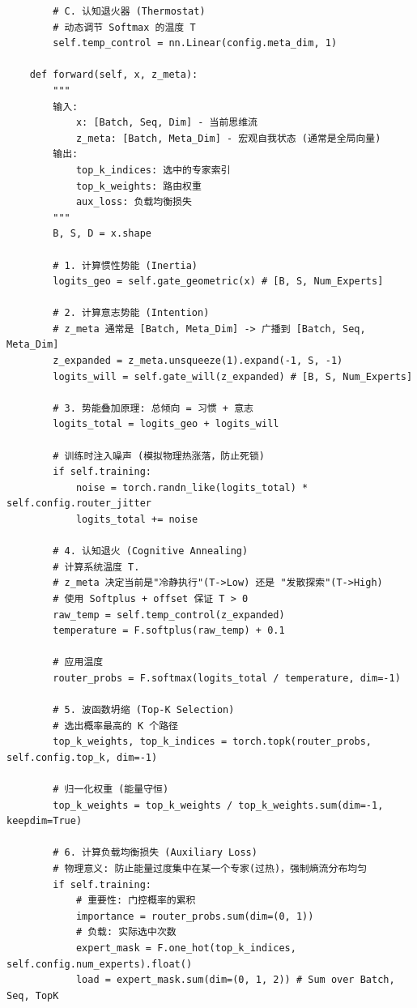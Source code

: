 \begin{lstlisting}
        # C. 认知退火器 (Thermostat)
        # 动态调节 Softmax 的温度 T
        self.temp_control = nn.Linear(config.meta_dim, 1)

    def forward(self, x, z_meta):
        """
        输入:
            x: [Batch, Seq, Dim] - 当前思维流
            z_meta: [Batch, Meta_Dim] - 宏观自我状态 (通常是全局向量)
        输出:
            top_k_indices: 选中的专家索引
            top_k_weights: 路由权重
            aux_loss: 负载均衡损失
        """
        B, S, D = x.shape

        # 1. 计算惯性势能 (Inertia)
        logits_geo = self.gate_geometric(x) # [B, S, Num_Experts]

        # 2. 计算意志势能 (Intention)
        # z_meta 通常是 [Batch, Meta_Dim] -> 广播到 [Batch, Seq, Meta_Dim]
        z_expanded = z_meta.unsqueeze(1).expand(-1, S, -1)
        logits_will = self.gate_will(z_expanded) # [B, S, Num_Experts]

        # 3. 势能叠加原理: 总倾向 = 习惯 + 意志
        logits_total = logits_geo + logits_will

        # 训练时注入噪声 (模拟物理热涨落，防止死锁)
        if self.training:
            noise = torch.randn_like(logits_total) * self.config.router_jitter
            logits_total += noise

        # 4. 认知退火 (Cognitive Annealing)
        # 计算系统温度 T.
        # z_meta 决定当前是"冷静执行"(T->Low) 还是 "发散探索"(T->High)
        # 使用 Softplus + offset 保证 T > 0
        raw_temp = self.temp_control(z_expanded)
        temperature = F.softplus(raw_temp) + 0.1

        # 应用温度
        router_probs = F.softmax(logits_total / temperature, dim=-1)

        # 5. 波函数坍缩 (Top-K Selection)
        # 选出概率最高的 K 个路径
        top_k_weights, top_k_indices = torch.topk(router_probs, self.config.top_k, dim=-1)

        # 归一化权重 (能量守恒)
        top_k_weights = top_k_weights / top_k_weights.sum(dim=-1, keepdim=True)

        # 6. 计算负载均衡损失 (Auxiliary Loss)
        # 物理意义: 防止能量过度集中在某一个专家(过热)，强制熵流分布均匀
        if self.training:
            # 重要性: 门控概率的累积
            importance = router_probs.sum(dim=(0, 1))
            # 负载: 实际选中次数
            expert_mask = F.one_hot(top_k_indices, self.config.num_experts).float()
            load = expert_mask.sum(dim=(0, 1, 2)) # Sum over Batch, Seq, TopK


\end{lstlisting}

